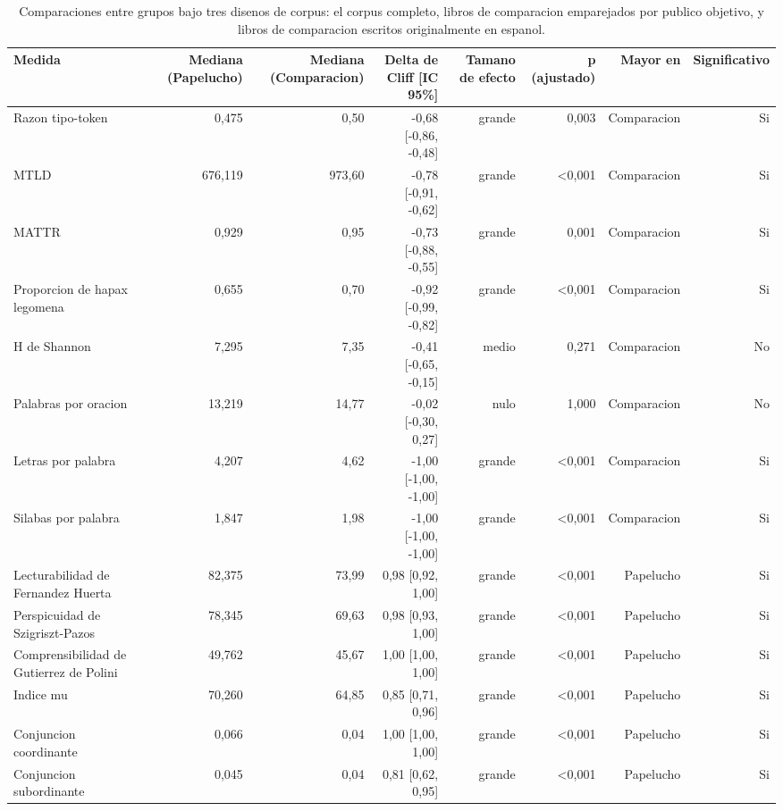\begin{table}[htbp]
\centering
\small
\caption{Comparaciones entre grupos bajo tres disenos de corpus: el corpus completo, libros de comparacion emparejados por publico objetivo, y libros de comparacion escritos originalmente en espanol.}
\label{tab:sensitivity-designs-es}
\begin{tabular}{lrrrrrrr}
\toprule
\textbf{Medida} & \textbf{Mediana (Papelucho)} & \textbf{Mediana (Comparacion)} & \textbf{Delta de Cliff [IC 95\%]} & \textbf{Tamano de efecto} & \textbf{p (ajustado)} & \textbf{Mayor en} & \textbf{Significativo} \\
\midrule
Razon tipo-token & 0,475 & 0,50 & -0,68 [-0,86, -0,48] & grande & 0,003 & Comparacion & Si \\
MTLD & 676,119 & 973,60 & -0,78 [-0,91, -0,62] & grande & <0,001 & Comparacion & Si \\
MATTR & 0,929 & 0,95 & -0,73 [-0,88, -0,55] & grande & 0,001 & Comparacion & Si \\
Proporcion de hapax legomena & 0,655 & 0,70 & -0,92 [-0,99, -0,82] & grande & <0,001 & Comparacion & Si \\
H de Shannon & 7,295 & 7,35 & -0,41 [-0,65, -0,15] & medio & 0,271 & Comparacion & No \\
Palabras por oracion & 13,219 & 14,77 & -0,02 [-0,30, 0,27] & nulo & 1,000 & Comparacion & No \\
Letras por palabra & 4,207 & 4,62 & -1,00 [-1,00, -1,00] & grande & <0,001 & Comparacion & Si \\
Silabas por palabra & 1,847 & 1,98 & -1,00 [-1,00, -1,00] & grande & <0,001 & Comparacion & Si \\
Lecturabilidad de Fernandez Huerta & 82,375 & 73,99 & 0,98 [0,92, 1,00] & grande & <0,001 & Papelucho & Si \\
Perspicuidad de Szigriszt-Pazos & 78,345 & 69,63 & 0,98 [0,93, 1,00] & grande & <0,001 & Papelucho & Si \\
Comprensibilidad de Gutierrez de Polini & 49,762 & 45,67 & 1,00 [1,00, 1,00] & grande & <0,001 & Papelucho & Si \\
Indice mu & 70,260 & 64,85 & 0,85 [0,71, 0,96] & grande & <0,001 & Papelucho & Si \\
Conjuncion coordinante & 0,066 & 0,04 & 1,00 [1,00, 1,00] & grande & <0,001 & Papelucho & Si \\
Conjuncion subordinante & 0,045 & 0,04 & 0,81 [0,62, 0,95] & grande & <0,001 & Papelucho & Si \\

\end{tabular}
\end{table}
